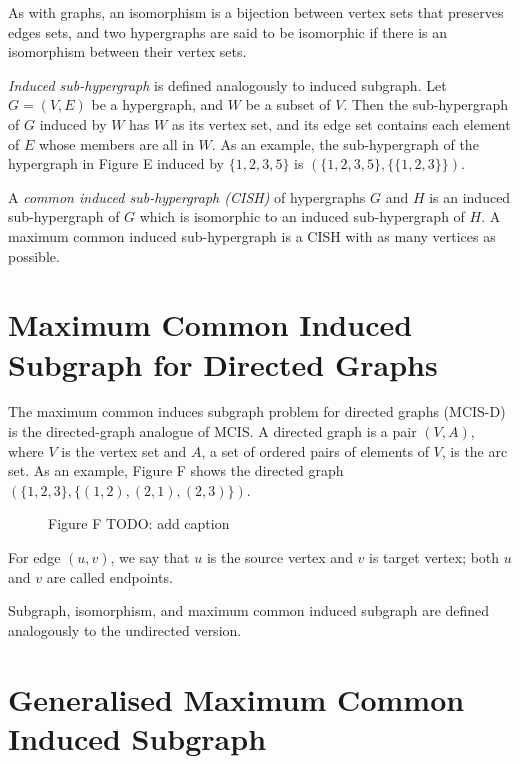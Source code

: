As with graphs, an isomorphism is a bijection between vertex sets that
preserves edges sets, and two hypergraphs are said to be isomorphic if there is
an isomorphism between their vertex sets.

\emph{Induced sub-hypergraph} is defined analogously to induced subgraph.  Let $G=(V,E)$
be a hypergraph, and $W$ be a subset of $V$. Then the sub-hypergraph of $G$ induced
by $W$ has $W$ as its vertex set, and its edge set contains each element of $E$ whose
members are all in $W$. As an example, the sub-hypergraph of the hypergraph in
Figure E induced by $\{1,2,3,5\}$ is $(\{1,2,3,5\}, \{\{1,2,3\}\})$.

A \emph{common induced sub-hypergraph (CISH)} of hypergraphs $G$ and $H$ is an induced
sub-hypergraph of $G$ which is isomorphic to an induced sub-hypergraph of $H$. A
maximum common induced sub-hypergraph is a CISH with as many vertices as
possible.

\section{Maximum Common Induced Subgraph for Directed Graphs}

The maximum common induces subgraph problem for directed graphs (MCIS-D) is the
directed-graph analogue of MCIS.  A directed graph is a pair $(V,A)$, where $V$ is
the vertex set and $A$, a set of ordered pairs of elements of $V$, is the arc set.
As an example, Figure F shows the directed graph $(\{1,2,3\}, \{(1,2), (2,1),
(2,3)\})$.

\begin{figure}[h!]
\centering
{}
\caption{Figure F TODO: add caption}
\end{figure}

For edge $(u,v)$, we say that $u$ is the source vertex and $v$ is target vertex; both
$u$ and $v$ are called endpoints.

Subgraph, isomorphism, and maximum common induced subgraph are defined
analogously to the undirected version.

\section{Generalised Maximum Common Induced Subgraph}

